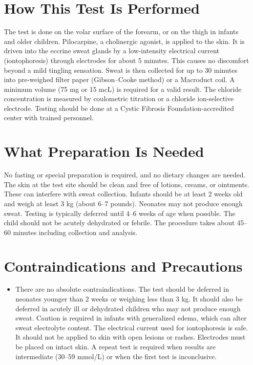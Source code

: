 \section*{How This Test Is Performed}
The test is done on the volar surface of the forearm, or on the thigh in infants and older children. Pilocarpine, a cholinergic agonist, is applied to the skin. It is driven into the eccrine sweat glands by a low-intensity electrical current (iontophoresis) through electrodes for about 5 minutes. This causes no discomfort beyond a mild tingling sensation. Sweat is then collected for up to 30 minutes into pre-weighed filter paper (Gibson--Cooke method) or a Macroduct coil. A minimum volume (75 mg or 15 mcL) is required for a valid result. The chloride concentration is measured by coulometric titration or a chloride ion-selective electrode. Testing should be done at a Cystic Fibrosis Foundation-accredited center with trained personnel.
\section*{What Preparation Is Needed}
No fasting or special preparation is required, and no dietary changes are needed. The skin at the test site should be clean and free of lotions, creams, or ointments. These can interfere with sweat collection. Infants should be at least 2 weeks old and weigh at least 3 kg (about 6--7 pounds). Neonates may not produce enough sweat. Testing is typically deferred until 4--6 weeks of age when possible. The child should not be acutely dehydrated or febrile. The procedure takes about 45--60 minutes including collection and analysis.
\section*{Contraindications and Precautions}
\begin{itemize}
  \item There are no absolute contraindications. The test should be deferred in neonates younger than 2 weeks or weighing less than 3 kg. It should also be deferred in acutely ill or dehydrated children who may not produce enough sweat. Caution is required in infants with generalized edema, which can alter sweat electrolyte content. The electrical current used for iontophoresis is safe. It should not be applied to skin with open lesions or rashes. Electrodes must be placed on intact skin. A repeat test is required when results are intermediate (30--59 mmol/L) or when the first test is inconclusive.
\end{itemize}

